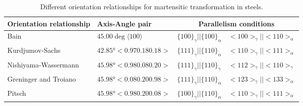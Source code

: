 
\begin{table*}
\begin{tabular}{ l l l l }
\hline\hline
    Orientation relationship & Axis-Angle pair & \multicolumn{2}{c}{Parallelism conditions} \\
    \hline
    Bain \cite{bain1924nature} &
    $45.00\deg\langle100\rangle$ &
    $\{100\}_{\gamma}||\{100\}_{\alpha}$ & $<100>_{\gamma}||<110>_{\alpha}$ \\
    
    Kurdjumov-Sachs \cite{kurdjumow1930mechanismus} &
    $42.85°<0.97 0.18 0.18>$ &
    $\{111\}_{\gamma}||\{110\}_{\alpha}$ &
    $<110>_{\gamma}||<111>_{\alpha}$ \\
    
    Nishiyama-Wassermann \cite{nishiyama1934x,wassermann1935ueber} &
    $45.98° <0.98 0.08 0.20>$ &
    $\{111\}_{\gamma}||\{110\}_{\gamma}$ &
    $<112>_{\gamma}||<110>_{\gamma}$ \\
    
    Greninger and Troiano \cite{greninger1949mechanism} &
    $45.98° <0.08 0.20 0.98>$ &
    $\{111\}_{\gamma} || \{110\}_{\alpha}$ &
    $<123>_{\gamma} || <133>_{\alpha}$ \\
    
    Pitsch \cite{pitsch1962orientierungszusammenhang} &
    $45.98° <0.98 0.20 0.08>$ &
    $\{100\}_{\gamma} || \{110\}_{\alpha}$ &
    $<110>_{\gamma} || <111>_{\alpha}$ \\
\hline
\end{tabular}
\caption{\label{table_ORs}Different orientation relationships for martensitic transformation in steels.}
\end{table*}
